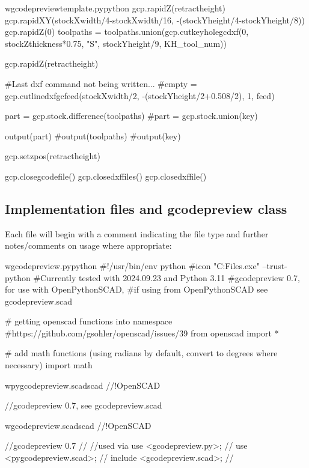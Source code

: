 \documentclass{ltxdoc}
\begin{document}
\begin{writecode}{w}{gcodepreviewtemplate.py}{python}
gcp.rapidZ(retractheight)
gcp.rapidXY(stockXwidth/4-stockXwidth/16, -(stockYheight/4-stockYheight/8))
gcp.rapidZ(0)
toolpaths = toolpaths.union(gcp.cutkeyholegcdxf(0, stockZthickness*0.75, "S", stockYheight/9, KH_tool_num))

gcp.rapidZ(retractheight)

#Last dxf command not being written...
#empty = gcp.cutlinedxfgcfeed(stockXwidth/2, -(stockYheight/2+0.508/2), 1, feed)

part = gcp.stock.difference(toolpaths)
#part = gcp.stock.union(key)

output(part)
#output(toolpaths)
#output(key)

gcp.setzpos(retractheight)

gcp.closegcodefile()
gcp.closedxffiles()
gcp.closedxffile()

\end{writecode}
\addtocounter{gcptmplpy}{293}

\subsection{Implementation files and gcodepreview class}
 
Each file will begin with a comment indicating the file type and further notes/comments on usage where appropriate:

\begin{writecode}{w}{gcodepreview.py}{python}
#!/usr/bin/env python
#icon "C:\Program Files\PythonSCAD\bin\openscad.exe"  --trust-python
#Currently tested with 2024.09.23 and Python 3.11
#gcodepreview 0.7, for use with OpenPythonSCAD, 
#if using from OpenPythonSCAD see gcodepreview.scad

# getting openscad functions into namespace
#https://github.com/gsohler/openscad/issues/39
from openscad import *

# add math functions (using radians by default, convert to degrees where necessary)
import math

\end{writecode}
\addtocounter{gcpy}{14}

\begin{writecode}{w}{pygcodepreview.scad}{scad}
//!OpenSCAD
 
//gcodepreview 0.7, see gcodepreview.scad

\end{writecode}
\addtocounter{pyscad}{4}

\begin{writecode}{w}{gcodepreview.scad}{scad}
//!OpenSCAD
 
//gcodepreview 0.7
//
//used via use <gcodepreview.py>;
//         use <pygcodepreview.scad>;
//         include <gcodepreview.scad>;
//

\end{writecode}
\addtocounter{gcpscad}{9}
\end{document}
